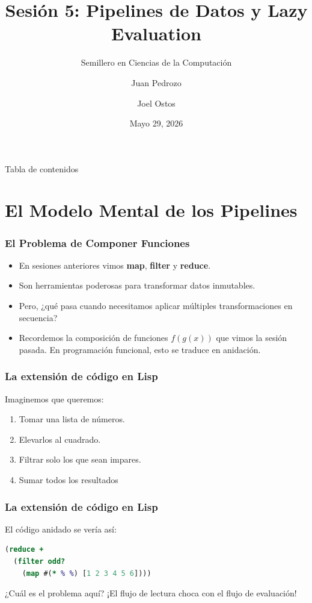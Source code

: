\documentclass{beamer}
\title{Sesión 5: Pipelines de Datos y Lazy Evaluation}
\subtitle{Semillero en Ciencias de la Computación}
\author[Pedrozo, Ostos]{Juan Pedrozo \and Joel Ostos}
\date{Mayo 29, 2026}
\begin{document}
\frame{\titlepage}

\begin{frame}{Tabla de contenidos}
    \tableofcontents    
\end{frame}

\section{El Modelo Mental de los Pipelines}

\begin{frame}
    \frametitle{El Problema de Componer Funciones}
    \begin{itemize}
        \item En sesiones anteriores vimos \textbf{map}, \textbf{filter} y \textbf{reduce}.
        \item Son herramientas poderosas para transformar datos inmutables.
        \item Pero, ¿qué pasa cuando necesitamos aplicar múltiples transformaciones en secuencia?
        \item Recordemos la composición de funciones $f(g(x))$ 
        que vimos la sesión pasada. En programación funcional, esto se traduce en anidación.
    \end{itemize}
\end{frame}

\begin{frame}[fragile]
    \frametitle{La extensión de código en Lisp}
    Imaginemos que queremos:
    \begin{enumerate}
        \item Tomar una lista de números.
        \item Elevarlos al cuadrado.
        \item Filtrar solo los que sean impares.
        \item Sumar todos los resultados
        \end{enumerate}
    \end{frame}

\begin{frame}[fragile]
    \frametitle{La extensión de código en Lisp}
    El código anidado se vería así:
    \vspace{0.5cm}
    \begin{lstlisting}[language=Clojure]
(reduce + 
  (filter odd? 
    (map #(* % %) [1 2 3 4 5 6])))
    \end{lstlisting}
    \vspace{0.5cm}
    ¿Cuál es el problema aquí? ¡El flujo de lectura choca con el flujo de evaluación!
\end{frame}
\end{document}
